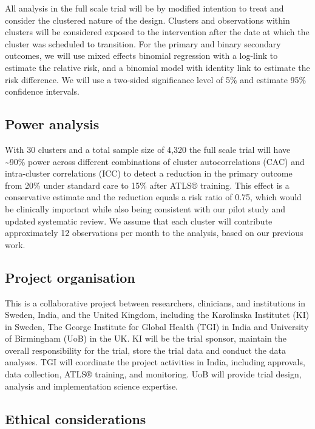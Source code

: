 \documentclass[
  11pt,
]{article}
\begin{document}
All analysis in the full scale trial will be by modified intention to treat and consider the clustered nature of the design. Clusters and observations within clusters will be considered exposed to the intervention after the date at which the cluster was scheduled to transition. For the primary and binary secondary outcomes, we will use mixed effects binomial regression with a log-link to estimate the relative risk, and a binomial model with identity link to estimate the risk difference. We will use a two-sided significance level of 5\% and estimate 95\% confidence intervals.

\hypertarget{power-analysis}{%
\subsection{Power analysis}\label{power-analysis}}

With 30 clusters and a total sample size of 4,320 the full scale trial will have \textasciitilde90\% power across different combinations of cluster autocorrelations (CAC) and intra-cluster correlations (ICC) to detect a reduction in the primary outcome from 20\% under standard care to 15\% after ATLS® training. This effect is a conservative estimate and the reduction equals a risk ratio of 0.75, which would be clinically important while also being consistent with our pilot study and updated systematic review. We assume that each cluster will contribute approximately 12 observations per month to the analysis, based on our previous work.

\hypertarget{project-organisation}{%
\subsection{Project organisation}\label{project-organisation}}

This is a collaborative project between researchers, clinicians, and institutions in Sweden, India, and the United Kingdom, including the Karolinska Institutet (KI) in Sweden, The George Institute for Global Health (TGI) in India and University of Birmingham (UoB) in the UK. KI will be the trial sponsor, maintain the overall responsibility for the trial, store the trial data and conduct the data analyses. TGI will coordinate the project activities in India, including approvals, data collection, ATLS® training, and monitoring. UoB will provide trial design, analysis and implementation science expertise.

\hypertarget{ethical-considerations}{%
\subsection{Ethical considerations}\label{ethical-considerations}}
\end{document}
